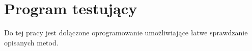 \chapter{Program testujący}

Do tej pracy jest dołączone oprogramowanie umożliwiające łatwe sprawdzanie
opisanych metod. 

